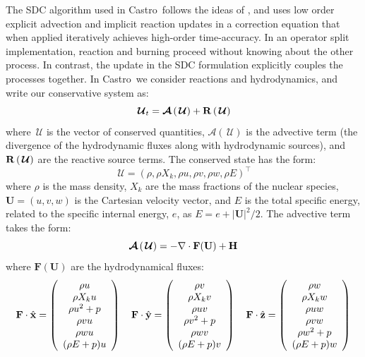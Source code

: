 \documentclass[a4paper]{jpconf}
\newcommand{\castro}{{\sffamily Castro}}
\newcommand{\Uc}{{\,\bm{\mathcal{U}}}}
\newcommand{\Advs}[1]{\boldsymbol{\mathcal{A}} \left(#1\right)}
\newcommand{\Ub}{\mathbf{U}}
\newcommand{\Fb}{\mathbf{F}}
\newcommand{\Rbs}[1]{{\bf R} \left ( #1 \right )}
\begin{document}
The SDC algorithm used in \castro\ follows the ideas of
\cite{dutt:2000,minion:2003}, and uses low order explicit advection
and implicit reaction updates in a correction equation that when
applied iteratively achieves high-order time-accuracy.  In an operator
split implementation, reaction and burning proceed without knowing
about the other process.  In contrast, the update in the SDC
formulation explicitly couples the processes together.  In \castro\ we
consider reactions and hydrodynamics, and write our conservative
system as:
\begin{equation}
\Uc_t = \Advs{\Uc} + \Rbs{\Uc}
\end{equation}
where $\Uc$ is the vector of conserved quantities, $\Advs{\Uc}$ is the
advective term (the divergence of the hydrodynamic fluxes along with
hydrodynamic sources), and $\Rbs{\Uc}$ are the reactive source terms.
The conserved state has the form:
\begin{equation}
\Uc = (\rho, \rho X_k, \rho u, \rho v, \rho w, \rho E)^\intercal
\end{equation}
where $\rho$ is the mass density, $X_k$ are the mass fractions of the
nuclear species, $\Ub = (u, v, w)$ is the Cartesian velocity vector,
and $E$ is the total specific energy, related to the specific internal
energy, $e$, as $E = e + |\Ub|^2/2$.  The advective term takes the form:
\begin{equation}
\Advs{\Uc} = -\nabla \cdot \Fb (\Ub) + {\bf H}
\end{equation}
where $\Fb(\Ub)$ are the hydrodynamical fluxes:
\begin{equation}
\Fb \cdot \hat{\bf x} = \left (\begin{array}{c} \rho u \\ \rho X_k u \\ \rho u^2 + p \\ \rho v u \\ \rho w u \\ (\rho E + p) u  \end{array} \right )
\quad
\Fb \cdot \hat{\bf y} = \left (\begin{array}{c} \rho v \\ \rho X_k v \\ \rho u v \\ \rho v^2 + p \\ \rho w v \\ (\rho E + p) v  \end{array} \right )
\quad
\Fb \cdot \hat{\bf z} = \left (\begin{array}{c} \rho w \\ \rho X_k w \\ \rho u w \\ \rho v w \\ \rho w^2 + p \\ (\rho E + p) w  \end{array} \right )
\end{equation}
\end{document}
